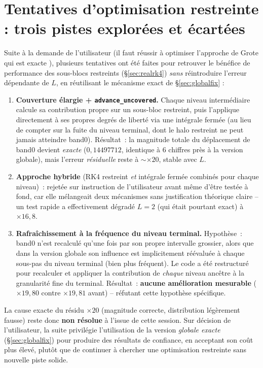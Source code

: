 \documentclass[11pt]{article}
\newcommand{\code}[1]{\texttt{#1}}
\begin{document}
\section{Tentatives d'optimisation restreinte : trois pistes explorées et écartées}
\label{sec:restrictedattempts}

Suite à la demande de l'utilisateur (\og il faut réussir à optimiser
l'approche de Grote qui est exacte \fg{}), plusieurs tentatives ont été
faites pour retrouver le bénéfice de performance des sous-blocs
restreints (\S\ref{sec:realrk4}) \emph{sans} réintroduire l'erreur
dépendante de $L$, en réutilisant le mécanisme exact de
\S\ref{sec:globalfix} :

\begin{enumerate}
  \item \textbf{Couverture élargie + \code{advance\_uncovered}.} Chaque
  niveau intermédiaire calcule sa contribution propre sur un sous-bloc
  restreint, puis l'applique directement à ses propres degrés de liberté
  via une intégrale fermée (au lieu de compter sur la fuite du niveau
  terminal, dont le halo restreint ne peut jamais atteindre band0).
  Résultat~: la magnitude totale du déplacement de band0 devient
  \emph{exacte} ($0{,}14497712$, identique à 6 chiffres près à la
  version globale), mais l'erreur \emph{résiduelle} reste à
  $\sim\times20$, stable avec $L$.
  \item \textbf{Approche hybride} (RK4 restreint \emph{et} intégrale
  fermée combinés pour chaque niveau)~: rejetée sur instruction de
  l'utilisateur avant même d'être testée à fond, car elle mélangeait
  deux mécanismes sans justification théorique claire -- un test rapide
  a effectivement dégradé $L=2$ (qui était pourtant exact) à
  $\times16{,}8$.
  \item \textbf{Rafraîchissement à la fréquence du niveau terminal.}
  Hypothèse~: band0 n'est recalculé qu'une fois par son propre intervalle
  grossier, alors que dans la version globale son influence est
  implicitement réévaluée à chaque sous-pas du niveau terminal (bien plus
  fréquent). Le code a été restructuré pour recalculer et appliquer la
  contribution de \emph{chaque} niveau ancêtre à la granularité fine du
  terminal. Résultat~: \textbf{aucune amélioration mesurable}
  ($\times19{,}80$ contre $\times19{,}81$ avant) -- réfutant cette
  hypothèse spécifique.
\end{enumerate}

La cause exacte du résidu $\times20$ (magnitude correcte, distribution
légèrement fausse) reste donc \textbf{non résolue} à l'issue de cette
session. Sur décision de l'utilisateur, la suite privilégie
l'utilisation de la version \emph{globale exacte} (\S\ref{sec:globalfix})
pour produire des résultats de confiance, en acceptant son coût plus
élevé, plutôt que de continuer à chercher une optimisation restreinte
sans nouvelle piste solide.
\end{document}
